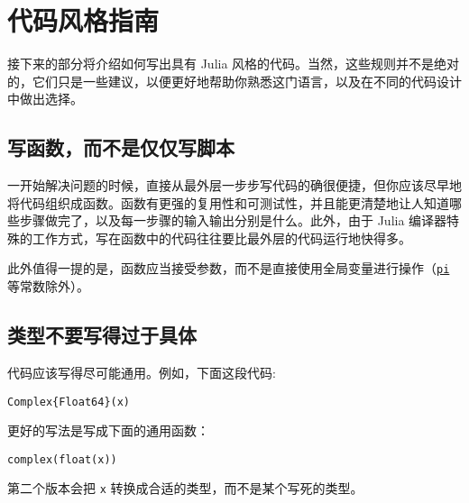\hypertarget{8293020885235442145}{}


\chapter{代码风格指南}



接下来的部分将介绍如何写出具有 Julia 风格的代码。当然，这些规则并不是绝对的，它们只是一些建议，以便更好地帮助你熟悉这门语言，以及在不同的代码设计中做出选择。



\hypertarget{14598192216141137141}{}


\section{写函数，而不是仅仅写脚本}



一开始解决问题的时候，直接从最外层一步步写代码的确很便捷，但你应该尽早地将代码组织成函数。函数有更强的复用性和可测试性，并且能更清楚地让人知道哪些步骤做完了，以及每一步骤的输入输出分别是什么。此外，由于 Julia 编译器特殊的工作方式，写在函数中的代码往往要比最外层的代码运行地快得多。



此外值得一提的是，函数应当接受参数，而不是直接使用全局变量进行操作（\hyperlink{4355513108985533054}{\texttt{pi}} 等常数除外）。



\hypertarget{14766885101141675893}{}


\section{类型不要写得过于具体}



代码应该写得尽可能通用。例如，下面这段代码:




\begin{verbatim}
Complex{Float64}(x)
\end{verbatim}



更好的写法是写成下面的通用函数：




\begin{verbatim}
complex(float(x))
\end{verbatim}



第二个版本会把 \texttt{x} 转换成合适的类型，而不是某个写死的类型。



